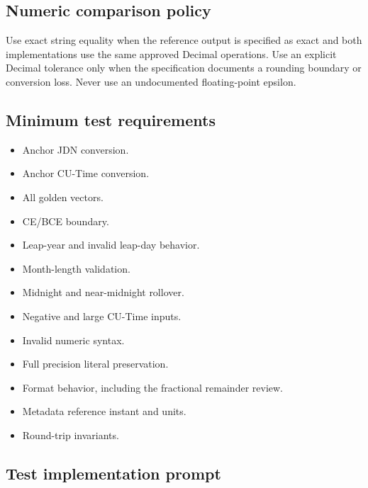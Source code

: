 \documentclass[11pt,letterpaper]{article}
\newcommand{\checkbox}{\(\square\)}
\begin{document}
\subsection{Numeric comparison policy}

Use exact string equality when the reference output is specified as exact and
both implementations use the same approved Decimal operations. Use an explicit
Decimal tolerance only when the specification documents a rounding boundary or
conversion loss. Never use an undocumented floating-point epsilon.

\subsection{Minimum test requirements}

\begin{itemize}
    \item[\checkbox] Anchor JDN conversion.
    \item[\checkbox] Anchor CU-Time conversion.
    \item[\checkbox] All golden vectors.
    \item[\checkbox] CE/BCE boundary.
    \item[\checkbox] Leap-year and invalid leap-day behavior.
    \item[\checkbox] Month-length validation.
    \item[\checkbox] Midnight and near-midnight rollover.
    \item[\checkbox] Negative and large CU-Time inputs.
    \item[\checkbox] Invalid numeric syntax.
    \item[\checkbox] Full precision literal preservation.
    \item[\checkbox] Format behavior, including the fractional remainder review.
    \item[\checkbox] Metadata reference instant and units.
    \item[\checkbox] Round-trip invariants.
\end{itemize}

\subsection{Test implementation prompt}
\end{document}
